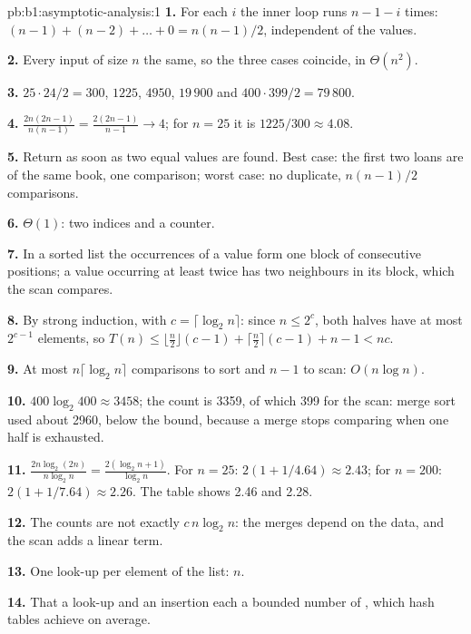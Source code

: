 \begin{solution}{pb:b1:asymptotic-analysis:1}
\textbf{1.} For each $i$ the inner loop runs $n - 1 - i$ times: $(n - 1) + (n - 2) + \dots + 0 = n(n - 1)/2$, independent
of the values.

\textbf{2.} Every input of size $n$  the same, so the three cases coincide, in $\Theta(n^2)$.

\textbf{3.} $25 \cdot 24/2 = 300$, $1225$, $4950$, $19\,900$ and $400 \cdot 399/2 = 79\,800$.

\textbf{4.} $\frac{2n(2n - 1)}{n(n - 1)} = \frac{2(2n - 1)}{n - 1} \to 4$; for $n = 25$ it is $1225/300 \approx 4.08$.

\textbf{5.} Return as soon as two equal values are found. Best case: the first two loans are of the same book, one
comparison; worst case: no duplicate, $n(n - 1)/2$ comparisons.

\textbf{6.} $\Theta(1)$: two indices and a counter.

\textbf{7.} In a sorted list the occurrences of a value form one block of consecutive positions; a value occurring at
least twice has two neighbours in its block, which the scan compares.

\textbf{8.} By strong induction, with $c = \lceil \log_2 n \rceil$: since $n \leq 2^c$, both halves have at most
$2^{c - 1}$ elements, so $T(n) \leq \lfloor \frac n2 \rfloor (c - 1) + \lceil \frac n2 \rceil (c - 1) + n - 1 < nc$.

\textbf{9.} At most $n \lceil \log_2 n \rceil$ comparisons to sort and $n - 1$ to scan: $O(n \log n)$.

\textbf{10.} $400 \log_2 400 \approx 3458$; the count is 3359, of which 399 for the scan: merge sort used about 2960, below
the bound, because a merge stops comparing when one half is exhausted.

\textbf{11.} $\frac{2n \log_2 (2n)}{n \log_2 n} = \frac{2(\log_2 n + 1)}{\log_2 n}$. For $n = 25$: $2(1 + 1/4.64) \approx
2.43$; for $n = 200$: $2(1 + 1/7.64) \approx 2.26$. The table shows 2.46 and 2.28.

\textbf{12.} The counts are not exactly $c\,n \log_2 n$: the merges depend on the data, and the scan adds a linear term.

\textbf{13.} One look-up per element of the list: $n$.

\textbf{14.} That a look-up and an insertion each  a bounded number of , which hash tables
achieve on average.


\end{solution}
